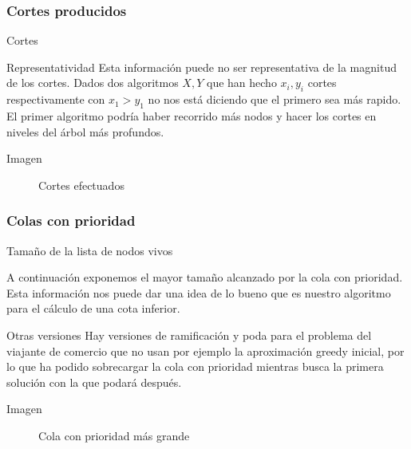 \subsubsection{Cortes producidos}
\begin{frame}{Cortes}
	\begin{block}{Representatividad}
	Esta información puede no ser representativa de la
	magnitud de los cortes. Dados dos algoritmos $X,Y$ que han hecho $x_i,y_i$ cortes
	respectivamente con $x_1>y_1$ no nos está diciendo que el primero sea más rapido.
	El primer algoritmo podría haber recorrido más nodos y hacer los cortes en niveles 
	del árbol más profundos. 
	\end{block}
\end{frame}
 
\begin{frame}
	\begin{exampleblock}{Imagen}
	\begin{figure}[H]
    		\centering
    		\caption{Cortes efectuados}
	\end{figure}
	\end{exampleblock}
\end{frame}


\subsubsection{Colas con prioridad}
\begin{frame}{Tamaño de la lista de nodos vivos}
	\begin{block}{ }
	A continuación exponemos el mayor tamaño alcanzado por la cola con prioridad.
	Esta información nos puede dar una idea de lo bueno que es nuestro algoritmo 
	para el cálculo de una cota inferior.
	\end{block}
	
	\begin{block}{Otras versiones}
	Hay versiones de ramificación y poda para el problema del viajante
	de comercio que no usan por ejemplo la aproximación greedy inicial, por lo que ha podido 
	sobrecargar la cola con prioridad mientras busca la primera solución con la que podará después.
	\end{block}
\end{frame}

\begin{frame}
	\begin{exampleblock}{Imagen}
	\begin{figure}[H]
    		\centering
    		\caption{Cola con prioridad más grande}
	\end{figure}
	\end{exampleblock}
\end{frame}


